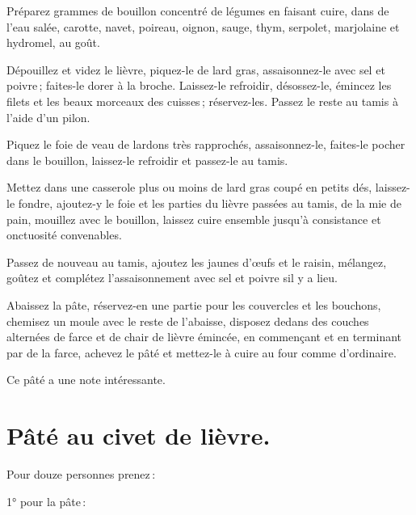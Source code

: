 Préparez {\mmm} grammes de bouillon concentré de légumes en faisant
cuire, dans de l'eau salée, carotte, navet, poireau, oignon, sauge, thym,
serpolet, marjolaine et hydromel, au goût.

Dépouillez et videz le lièvre, piquez-le de lard gras, assaisonnez-le avec sel
et poivre ; faites-le dorer à la broche. Laissez-le refroidir, désossez-le,
émincez les filets et les beaux morceaux des cuisses ; réservez-les. Passez le
reste au tamis à l'aide d'un pilon.

Piquez le foie de veau de lardons très rapprochés, assaisonnez-le, faites-le
pocher dans le bouillon, laissez-le refroidir et passez-le au tamis.

Mettez dans une casserole plus ou moins de lard gras coupé en petits dés,
laissez-le fondre, ajoutez-y le foie et les parties du lièvre passées au tamis,
de la mie de pain, mouillez avec le bouillon, laissez cuire ensemble jusqu'à
consistance et onctuosité convenables.

Passez de nouveau au tamis, ajoutez les jaunes d'œufs et le raisin, mélangez,
goûtez et complétez l'assaisonnement avec sel et poivre sil y a lieu.

Abaissez la pâte, réservez-en une partie pour les couvercles et les bouchons,
chemisez un moule avec le reste de l'abaisse, disposez dedans des couches
alternées de farce et de chair de lièvre émincée, en commençant et en terminant
par de la farce, achevez le pâté et mettez-le à cuire au four comme
d'ordinaire.

Ce pâté a une note intéressante.

\section*{\centering Pâté au civet de lièvre.}
{}

Pour douze personnes prenez :

\medskip

1° pour la pâte :

